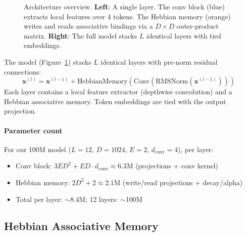 \documentclass{article}
\newcommand{\vx}{\mathbf{x}}
\begin{document}
\begin{figure}[t]
\caption{Architecture overview. \textbf{Left}: A single layer. The conv block (blue) extracts local features over 4 tokens. The Hebbian memory (orange) writes and reads associative bindings via a $D{\times}D$ outer-product matrix. \textbf{Right}: The full model stacks $L$ identical layers with tied embeddings.}
\label{fig:arch}
\end{figure}

The model (Figure~\ref{fig:arch}) stacks $L$ identical layers with pre-norm residual connections:
\begin{equation}
    \vx^{(l)} = \vx^{(l-1)} + \text{HebbianMemory}(\text{Conv}(\text{RMSNorm}(\vx^{(l-1)})))
\end{equation}
Each layer contains a local feature extractor (depthwise convolution) and a Hebbian associative memory. Token embeddings are tied with the output projection.

\paragraph{Parameter count} For our 100M model ($L{=}12$, $D{=}1024$, $E{=}2$, $d_\text{conv}{=}4$), per layer:
\begin{itemize}
    \item Conv block: $3ED^2 + ED \cdot d_\text{conv} \approx 6.3\text{M}$ (projections + conv kernel)
    \item Hebbian memory: $2D^2 + 2 \approx 2.1\text{M}$ (write/read projections + decay/alpha)
    \item Total per layer: $\sim$8.4M; 12 layers: $\sim$100M
\end{itemize}

\FloatBarrier

\subsection{Hebbian Associative Memory}
\end{document}
